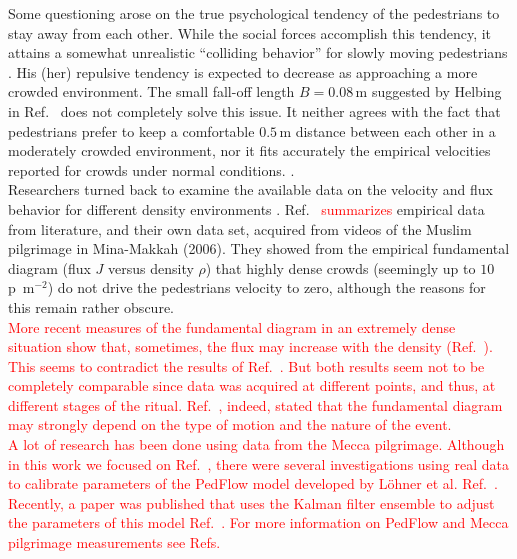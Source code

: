 \documentclass[preprint,12pt]{elsarticle}
\begin{document}
Some questioning arose on the true psychological tendency of the pedestrians to 
stay away from each other. While the social forces accomplish this tendency, it 
attains a somewhat unrealistic ``colliding behavior'' for slowly moving 
pedestrians \cite{Lakoba}. His (her) repulsive tendency is expected to decrease 
as approaching a more crowded environment. The small fall-off length $B=0.08\,$m 
suggested by Helbing in Ref.~\cite{Helbing1} does not completely solve this 
issue. It neither agrees with the fact that pedestrians prefer to keep a 
comfortable $0.5\,$m distance between each other in a moderately crowded 
environment, nor it fits accurately the empirical velocities reported for 
crowds under normal conditions. \cite{Lakoba}.  \\

Researchers turned back to examine the available data on the velocity and flux 
behavior for different density environments \cite{Boltes,helbing3,seyfried1,seyfried}. 
Ref.~\cite{helbing3} \textcolor{red}{summarizes} empirical data from 
literature, and their own data set, acquired from videos of the Muslim 
pilgrimage in Mina-Makkah (2006). They showed from the empirical fundamental 
diagram (flux $J$ versus density $\rho$) that highly dense crowds (seemingly up 
to $10\,$p~m$^{-2}$) do not drive the pedestrians velocity to zero, although the 
reasons for this remain rather obscure.   \\

\textcolor{red}{More recent measures of the fundamental diagram in an extremely dense
 situation show that, sometimes, the flux may increase with the density (Ref.~\cite{lohner1}). 
This seems to contradict the results of Ref.~\cite{helbing3}. But both results seem 
not to be completely  comparable since data was acquired at different points, and thus,
at different stages of the ritual. Ref.~\cite{lohner1}, indeed, stated that the fundamental 
diagram may strongly depend on the type of motion and the nature of the event.}\\

\textcolor{red}{A lot of research has been done using data from the Mecca pilgrimage.
Although in this work we focused on Ref.~\cite{helbing3}, there were several investigations 
using real data to calibrate parameters of the PedFlow model developed by 
L\"ohner et al. Ref.~\cite{lohner2}. Recently, a paper was published that uses 
the Kalman filter ensemble to adjust the parameters of this model Ref.~\cite{Togashi1}. 
For more information on PedFlow and Mecca pilgrimage measurements
see Refs.~\cite{Boltes,Dridi1,Dridi2,Baqui1,lohner1} }\\
\end{document}
